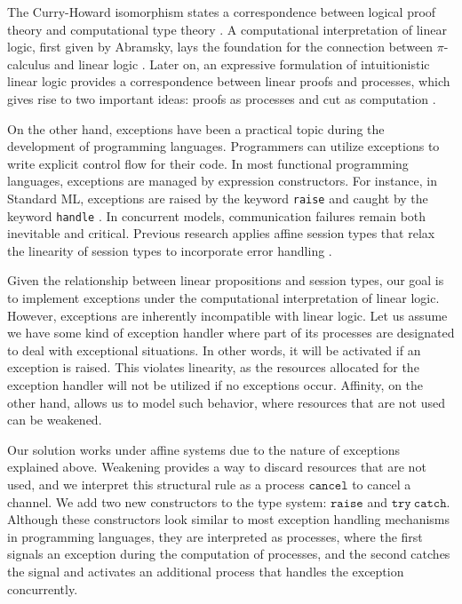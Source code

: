 \documentclass[12pt, openany]{memoir}
\begin{document}
The Curry-Howard isomorphism states a correspondence between logical proof theory and computational type theory \cite{Howard1980}.
A computational interpretation of linear logic, first given by Abramsky, lays the foundation for the connection between $\pi$-calculus and linear logic \cite{Abramsky1933}. 
Later on, an expressive formulation of intuitionistic linear logic provides a correspondence between linear proofs and processes, 
which gives rise to two important ideas: proofs as processes \cite{Abramsky1994} and cut as computation \cite{Caires2014}.

On the other hand, exceptions have been a practical topic during the development of programming languages.
Programmers can utilize exceptions to write explicit control flow for their code. In most functional programming languages, exceptions are managed by expression constructors. 
For instance, in Standard ML, exceptions are raised by the keyword \texttt{raise} and caught by the keyword \texttt{handle} \cite{Milner1997}. 
In concurrent models, communication failures remain both inevitable and critical. 
Previous research applies affine session types that relax the linearity of session types to incorporate error handling \cite{Mos2014}.

Given the relationship between linear propositions and session types, our goal is to implement exceptions under the computational interpretation of linear logic.
However, exceptions are inherently incompatible with linear logic. 
Let us assume we have some kind of exception handler where part of its processes are designated to deal with exceptional situations. 
In other words, it will be activated if an exception is raised. 
This violates linearity, as the resources allocated for the exception handler will not be utilized if no exceptions occur. 
Affinity, on the other hand, allows us to model such behavior, where resources that are not used can be weakened.

Our solution works under affine systems due to the nature of exceptions explained above. 
Weakening provides a way to discard resources that are not used, and we interpret this structural rule as a process $\texttt{cancel}$ to cancel a channel. 
We add two new constructors to the type system: $\texttt{raise}$ and $\texttt{try}\ \texttt{catch}$. 
Although these constructors look similar to most exception handling mechanisms in programming languages, 
they are interpreted as processes, where the first signals an exception during the computation of processes,
and the second catches the signal and activates an additional process that handles the exception concurrently.
\end{document}
